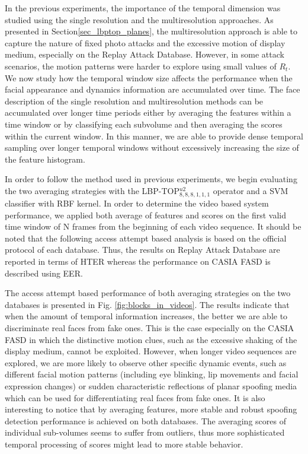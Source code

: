 In the previous experiments, the importance of the temporal dimension was studied using the single resolution and the multiresolution approaches. As presented in Section\ref{sec_lbptop_planes}, the multiresolution approach is able to capture the nature of fixed photo attacks and the excessive motion of display medium, especially on the Replay Attack Database. However, in some attack scenarios, the motion patterns were harder to explore using small values of $R_t$. We now study how the temporal window size affects the performance when the facial appearance and dynamics information are accumulated over time. The face description of the single resolution and multiresolution methods can be accumulated over longer time periods either by averaging the features within a time window or by classifying each subvolume and then averaging the scores within the current window. In this manner, we are able to provide dense temporal sampling over longer temporal windows without excessively increasing the size of the feature histogram.

In order to follow the method used in previous experiments, we begin evaluating the two averaging strategies with the LBP-TOP$_{8,8,8,1,1,1}^{u2}$ operator and a SVM classifier with RBF kernel. In order to determine the video based system performance, we applied both average of features and scores on the first valid time window of N frames from the beginning of each video sequence. It should be noted that the following access attempt based analysis is based on the official protocol of each database. Thus, the results on Replay Attack Database are reported in terms of HTER whereas the performance on CASIA FASD is described using EER.

The access attempt based performance of both averaging strategies on the two databases is presented in Fig. \ref{fig:blocks_in_videos}. The results indicate that when the amount of temporal information increases, the better we are able to discriminate real faces from fake ones. This is the case especially on the CASIA FASD in which the distinctive motion clues, such as the excessive shaking of the display medium, cannot be exploited. However, when longer video sequences are explored, we are more likely to observe other specific dynamic events, such as different facial motion patterns (including eye blinking, lip movements and facial expression changes) or sudden characteristic reflections of planar spoofing media which can be used for differentiating real faces from fake ones. It is also interesting to notice that by averaging features, more stable and robust spoofing detection performance is achieved on both databases. The averaging scores of individual sub-volumes seems to suffer from outliers, thus more sophisticated temporal processing of scores might lead to more stable behavior.


